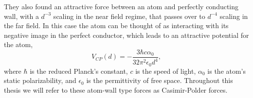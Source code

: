 They also found an attractive force between an atom and perfectly conducting wall, with a $d^{-3}$ scaling
in the near field regime, that passes over to $d^{-4}$ scaling in the far field.
In this case the atom can be thought of as interacting with its negative image in the perfect conductor,   
which leads to an attractive potential for the atom,
\begin{equation}
  V_{CP}(d) =-\frac{3\hbar c\alpha_0}{32\pi^2\epsilon_0 d^4},
\end{equation}
where $\hbar$ is the reduced Planck's constant, $c$ is the speed of light, $\alpha_0$ is the atom's static polarizability,
and $\epsilon_0$ is the permittivity of free space.  Throughout this thesis we will refer to these
atom-wall type forces as Casimir-Polder forces.  

